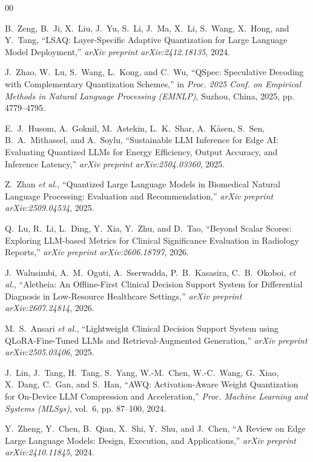\documentclass[conference]{IEEEtran}
\begin{document}
\begin{thebibliography}{00}

B.~Zeng, B.~Ji, X.~Liu, J.~Yu, S.~Li, J.~Ma, X.~Li, S.~Wang, X.~Hong, and Y.~Tang, ``LSAQ: Layer-Specific Adaptive Quantization for Large Language Model Deployment,'' \emph{arXiv preprint arXiv:2412.18135}, 2024.

J.~Zhao, W.~Lu, S.~Wang, L.~Kong, and C.~Wu, ``QSpec: Speculative Decoding with Complementary Quantization Schemes,'' in \emph{Proc. 2025 Conf. on Empirical Methods in Natural Language Processing (EMNLP)}, Suzhou, China, 2025, pp. 4779--4795.

E.~J.~Husom, A.~Goknil, M.~Astekin, L.~K.~Shar, A.~K{\aa}sen, S.~Sen, B.~A.~Mithassel, and A.~Soylu, ``Sustainable LLM Inference for Edge AI: Evaluating Quantized LLMs for Energy Efficiency, Output Accuracy, and Inference Latency,'' \emph{arXiv preprint arXiv:2504.03360}, 2025.

Z.~Zhan \emph{et al.}, ``Quantized Large Language Models in Biomedical Natural Language Processing: Evaluation and Recommendation,'' \emph{arXiv preprint arXiv:2509.04534}, 2025.

Q.~Lu, R.~Li, L.~Ding, Y.~Xia, Y.~Zhu, and D.~Tao, ``Beyond Scalar Scores: Exploring LLM-based Metrics for Clinical Significance Evaluation in Radiology Reports,'' \emph{arXiv preprint arXiv:2606.18797}, 2026.

J.~Walusimbi, A.~M.~Oguti, A.~Sserwadda, P.~B.~Kasasira, C.~B.~Okoboi, \emph{et al.}, ``Aletheia: An Offline-First Clinical Decision Support System for Differential Diagnosis in Low-Resource Healthcare Settings,'' \emph{arXiv preprint arXiv:2607.24814}, 2026.

M.~S.~Ansari \emph{et al.}, ``Lightweight Clinical Decision Support System using QLoRA-Fine-Tuned LLMs and Retrieval-Augmented Generation,'' \emph{arXiv preprint arXiv:2505.03406}, 2025.

J.~Lin, J.~Tang, H.~Tang, S.~Yang, W.-M.~Chen, W.-C.~Wang, G.~Xiao, X.~Dang, C.~Gan, and S.~Han, ``AWQ: Activation-Aware Weight Quantization for On-Device LLM Compression and Acceleration,'' \emph{Proc. Machine Learning and Systems (MLSys)}, vol.~6, pp. 87--100, 2024.

Y.~Zheng, Y.~Chen, B.~Qian, X.~Shi, Y.~Shu, and J.~Chen, ``A Review on Edge Large Language Models: Design, Execution, and Applications,'' \emph{arXiv preprint arXiv:2410.11845}, 2024.

\end{thebibliography}
\end{document}
